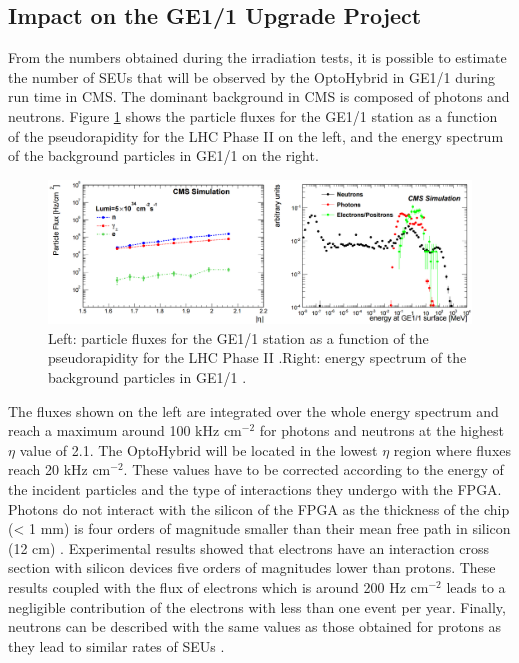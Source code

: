     \subsection{Impact on the GE1/1 Upgrade Project}

      From the numbers obtained during the irradiation tests, it is possible to estimate the number of SEUs that will be observed by the OptoHybrid in GE1/1 during run time in CMS. The dominant background in CMS is composed of photons and neutrons. Figure \ref{fig:II-5-neutrons} shows the particle fluxes for the GE1/1 station as a function of the pseudorapidity for the LHC Phase II on the left, and the energy spectrum of the background particles in GE1/1 on the right. \\

      \begin{figure}[t!]
        \centering
        \includegraphics[width=\textwidth]{img/II-5-irradiation/fluka.png}
        \caption{Left: particle fluxes for the GE1/1 station as a function of the pseudorapidity for the LHC Phase II \cite{Zenoni:2065693}.Right: energy spectrum of the background particles in GE1/1 \cite{Zenoni:2065693}.}
        \label{fig:II-5-neutrons}
      \end{figure}

      The fluxes shown on the left are integrated over the whole energy spectrum and reach a maximum around 100 kHz cm$^{-2}$ for photons and neutrons at the highest $\eta$ value of 2.1. The OptoHybrid will be located in the lowest $\eta$ region where fluxes reach 20 kHz cm$^{-2}$. These values have to be corrected according to the energy of the incident particles and the type of interactions they undergo with the FPGA. Photons do not interact with the silicon of the FPGA as the thickness of the chip (< 1 mm) is four orders of magnitude smaller than their mean free path in silicon (12 cm) \cite{Agashe:2014kda}. Experimental results \cite{trad} showed that electrons have an interaction cross section with silicon devices five orders of magnitudes lower than protons. These results coupled with the flux of electrons which is around 200 Hz cm$^{-2}$ leads to a negligible contribution of the electrons with less than one event per year. Finally, neutrons can be described with the same values as those obtained for protons as they lead to similar rates of SEUs \cite{Huhtinen2000155}. \\

